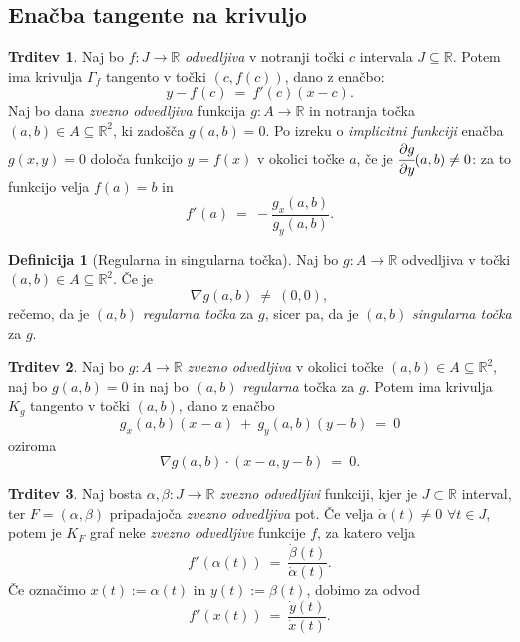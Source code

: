 \documentclass[11pt]{article}
\newcommand{\R}{\mathbb{R}}
\theoremstyle{definition}
\newtheorem{definicija}{Definicija}[section]
\theoremstyle{definition}
\newtheorem{trditev}{Trditev}[section]
\theoremstyle{definition}
\theoremstyle{theorem}
\begin{document}

\subsection{Enačba tangente na krivuljo}
\vspace{0.5cm}

\begin{trditev}

Naj bo $f: J \rightarrow \R$ \textit{odvedljiva} v notranji točki $c$ intervala $J \subseteq \R$. Potem ima krivulja $\Gamma_f$ tangento v točki $(c, f(c))$, dano z enačbo:
$$y - f(c) ~=~ f'(c)(x-c).$$
Naj bo dana \textit{zvezno odvedljiva} funkcija $g: A \rightarrow \R$ in notranja točka \hbox{$(a, b) \in A \subseteq \R^2$}, ki zadošča $g(a, b) = 0.$ Po izreku o \textit{implicitni funkciji} enačba $g(x, y) = 0$ določa funkcijo $y = f(x)$ v okolici točke $a$, če je $\cfrac{\partial g}{\partial y}(a, b) \neq 0$: za to funkcijo velja $f(a) = b$ in 
$$f'(a) ~=~ -\frac{g_x(a,b)}{g_y(a, b)}.$$

\end{trditev}
\vspace{0.5cm}

\begin{definicija}[Regularna in singularna točka]

Naj bo $g: A \rightarrow \mathbb{R}$ \hbox{odvedljiva} v točki $(a, b) \in A \subseteq \mathbb{R}^2$. Če je 
$$\nabla g(a, b) ~\neq~ (0, 0),$$
rečemo, da je $(a, b)$ \textit{regularna točka} za $g$, sicer pa, da je $(a, b)$ \textit{singularna točka} za $g$. 

\end{definicija}
\vspace{0.5cm}

\begin{trditev}

Naj bo $g: A \rightarrow \R$ \textit{zvezno odvedljiva} v okolici točke \hbox{$(a, b) \in A \subseteq \R^2$}, naj bo $g(a, b) = 0$ in naj bo $(a, b)$ \textit{regularna} točka za $g$. Potem ima krivulja $K_g$ tangento v točki $(a, b)$, dano z enačbo
$$g_x(a, b)(x-a) ~+~ g_y(a, b)(y-b) ~=~ 0$$
oziroma
$$\nabla{g(a, b)} \cdot (x-a, y-b) ~=~ 0.$$

\end{trditev}
\vspace{0.5cm}

\begin{trditev}

Naj bosta $\alpha, \beta: J \rightarrow \R$ \textit{zvezno odvedljivi} funkciji, kjer je $J \subset \R$ interval, ter $F = (\alpha, \beta)$ pripadajoča \textit{zvezno odvedljiva} pot. Če velja $\dot{\alpha}(t) \neq 0$ $\forall t \in J$, potem je $K_F$ graf neke \textit{zvezno odvedljive} funkcije $f$, za katero velja
$$f'(\alpha(t)) ~=~ \frac{\dot{\beta}(t)}{\dot{\alpha}(t)}.$$
Če označimo $x(t) := \alpha(t)$ in $y(t) := \beta(t)$, dobimo za odvod
$$f'(x(t)) ~=~ \frac{\dot{y}(t)}{\dot{x}(t)}.$$

\end{trditev}
\vspace{0.5cm}
\end{document}
